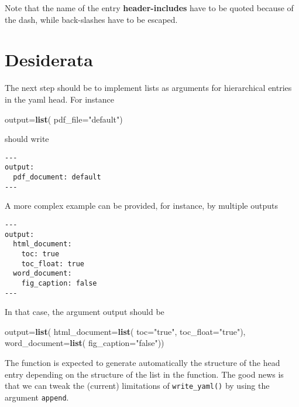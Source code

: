 \documentclass[
]{article}
\newenvironment{Shaded}{\begin{snugshade}}{\end{snugshade}}
\newcommand{\DataTypeTok}[1]{\textcolor[rgb]{0.13,0.29,0.53}{#1}}
\newcommand{\KeywordTok}[1]{\textcolor[rgb]{0.13,0.29,0.53}{\textbf{#1}}}
\newcommand{\NormalTok}[1]{#1}
\newcommand{\StringTok}[1]{\textcolor[rgb]{0.31,0.60,0.02}{#1}}
\begin{document}
Note that the name of the entry \textbf{header-includes} have to be
quoted because of the dash, while back-slashes have to be escaped.

\hypertarget{desiderata}{%
\section{Desiderata}\label{desiderata}}

The next step should be to implement lists as arguments for hierarchical
entries in the yaml head. For instance

\begin{Shaded}
\begin{Highlighting}[]
\NormalTok{output=}\KeywordTok{list}\NormalTok{(}
        \DataTypeTok{pdf\_file=}\StringTok{"default"}\NormalTok{)}
\end{Highlighting}
\end{Shaded}

should write

\begin{verbatim}
---
output:
  pdf_document: default
---
\end{verbatim}

A more complex example can be provided, for instance, by multiple
outputs

\begin{verbatim}
---
output:
  html_document:
    toc: true
    toc_float: true
  word_document:
    fig_caption: false
---
\end{verbatim}

In that case, the argument output should be

\begin{Shaded}
\begin{Highlighting}[]
\NormalTok{output=}\KeywordTok{list}\NormalTok{(}
        \DataTypeTok{html\_document=}\KeywordTok{list}\NormalTok{(}
                \DataTypeTok{toc=}\StringTok{"true"}\NormalTok{,}
                \DataTypeTok{toc\_float=}\StringTok{"true"}\NormalTok{),}
        \DataTypeTok{word\_document=}\KeywordTok{list}\NormalTok{(}
                \DataTypeTok{fig\_caption=}\StringTok{"false"}\NormalTok{))}
\end{Highlighting}
\end{Shaded}

The function is expected to generate automatically the structure of the
head entry depending on the structure of the list in the function. The
good news is that we can tweak the (current) limitations of
\texttt{write\_yaml()} by using the argument \texttt{append}.
\end{document}
